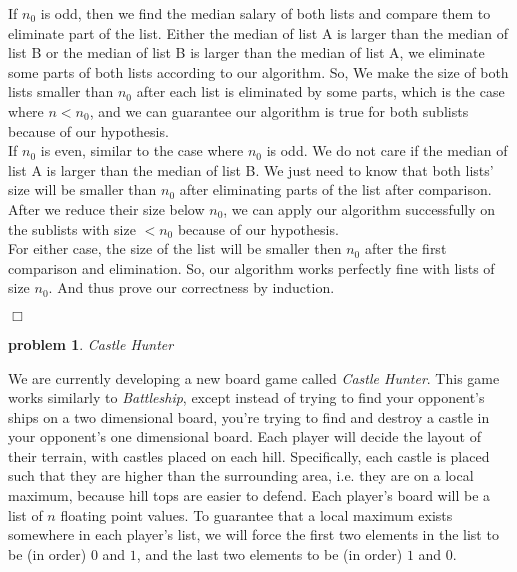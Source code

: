 \documentclass[10pt]{article}
\newenvironment{proof}{\par\noindent{\it Proof.}\hspace*{1em}}{$\Box$\bigskip}
\newtheorem{problem}{\sc\color{cit}problem}
\begin{document}
\begin{enumerate}
\begin{proof}
    	If $n_0$ is odd, then we find the median salary of both lists and compare them to eliminate part of the list. Either the median of list A is larger than the median of list B or the median of list B is larger than the median of list A, we eliminate some parts of both lists according to our algorithm. So, We make the size of both lists smaller than $n_0$ after each list is eliminated by some parts, which is the case where $n < n_0$, and we can guarantee our algorithm is true for both sublists because of our hypothesis. \\
    	
    	If $n_0$ is even, similar to the case where $n_0$ is odd. We do not care if the median of list A is larger than the median of list B. We just need to know that both lists' size will be smaller than $n_0$ after eliminating parts of the list after comparison. After we reduce their size below $n_0$, we can apply our algorithm successfully on the sublists with size $< n_0$ because of our hypothesis.\\
    	
    	For either case, the size of the list will be smaller then $n_0$ after the first comparison and elimination. So, our algorithm works perfectly fine with lists of size $n_0$. And thus prove our correctness by induction. 
    	
    \end{proof}
    
\end{enumerate}

\begin{problem}Castle Hunter\end{problem}

We are currently developing a new board game called \textit{Castle Hunter}. This game works similarly to \textit{Battleship}, except instead of trying to find your opponent's ships on a two dimensional board, you're trying to find and destroy a castle in your opponent's one dimensional board.  Each player will decide the layout of their terrain, with castles placed on each hill.  Specifically, each castle is placed such that they are higher than the surrounding area, i.e. they are on a local maximum, because hill tops are easier to defend.  Each player's board will be a list of $n$ floating point values. To guarantee that a local maximum exists somewhere in each player's list, we will force the first two elements in the list to be (in order) $0$ and $1$, and the last two elements to be (in order) $1$ and $0$. 
\end{document}
